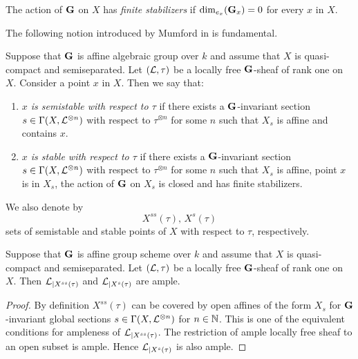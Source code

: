 \begin{definition}
The action of $\mathbf{G}$ on $X$ has \textit{finite stabilizers} if $\mathrm{dim}_{e_x}(\mathbf{G}_x) = 0$ for every $x$ in $X$.    
\end{definition}
\noindent
The following notion introduced by Mumford in \cite{mumford1994geometric} is fundamental.

\begin{definition}
Suppose that $\mathbf{G}$ is affine algebraic group over $k$ and assume that $X$ is quasi-compact and semiseparated. Let $({\mathcal L},\tau)$ be a locally free $\mathbf{G}$-sheaf of rank one on $X$. Consider a point $x$ in $X$. Then we say that:
\begin{enumerate}[label=\textbf{(\arabic*)}, leftmargin=3.0em]
\item \textit{$x$ is semistable with respect to $\tau$} if there exists a $\mathbf{G}$-invariant section $s\in \Gamma(X,{\mathcal L}^{\otimes n})$ with respect to $\tau^{\otimes n}$ for some $n$ such that $X_s$ is affine and contains $x$.
\item \textit{$x$ is stable with respect to $\tau$} if there exists a $\mathbf{G}$-invariant section $s\in \Gamma(X,{\mathcal L}^{\otimes n})$ with respect to $\tau^{\otimes n}$ for some $n$ such that $X_s$ is affine, point $x$ is in $X_s$, the action of $\mathbf{G}$ on $X_s$ is closed and has finite stabilizers.
\end{enumerate}
We also denote by
$$X^{ss}\left(\tau\right),\,X^s\left(\tau\right)$$
sets of semistable and stable points of $X$ with respect to $\tau$, respectively.
\end{definition}

\begin{fact}\label{fact:line_bundle_is_ample_on_sets_of_semistable_and_stable_points}
Suppose that $\mathbf{G}$ is affine group scheme over $k$ and assume that $X$ is quasi-compact and semiseparated. Let $({\mathcal L},\tau)$ be a locally free $\mathbf{G}$-sheaf of rank one on $X$. Then ${\mathcal L}_{\mid X^{ss}(\tau)}$ and ${\mathcal L}_{\mid X^s(\tau)}$ are ample.
\end{fact}
\begin{proof}
By definition $X^{ss}(\tau)$ can be covered by open affines of the form $X_s$ for $\mathbf{G}$-invariant global sections $s\in \Gamma(X, {\mathcal L}^{\otimes n})$ for $n\in {\mathbb N}$. This is one of the equivalent conditions for ampleness of ${\mathcal L}_{\mid X^{ss}(\tau)}$. The restriction of ample locally free sheaf to an open subset is ample. Hence ${\mathcal L}_{\mid X^s(\tau)}$ is also ample.    
\end{proof}

